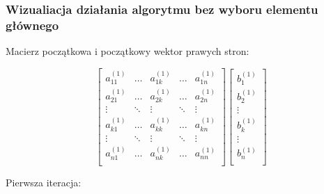 \documentclass{article}
\begin{document}
\subsubsection{Wizualiacja działania algorytmu bez wyboru elementu głównego}
Macierz początkowa i początkowy wektor prawych stron:
\begin{center}
    $$
    \begin{bmatrix}
        a^{(1)}_{11} & \dots & a^{(1)}_{1k} & \dots & a^{(1)}_{1n} \\
        a^{(1)}_{21} & \dots & a^{(1)}_{2k} & \dots & a^{(1)}_{2n} \\
        \vdots & \ddots &\vdots & \ddots & \vdots \\
        a^{(1)}_{k1} & \dots & a^{(1)}_{kk} & \dots & a^{(1)}_{kn} \\
        \vdots & \ddots & \vdots & \ddots & \vdots \\
        a^{(1)}_{n1} & \dots & a^{(1)}_{nk} & \dots & a^{(1)}_{nn} \\
    \end{bmatrix}
    \begin{bmatrix}
        b^{(1)}_{1} \\
        b^{(1)}_{2} \\
        \vdots \\
        b^{(1)}_{k} \\
        \vdots \\
        b^{(1)}_{n} \\
    \end{bmatrix}
    $$
\end{center}
Pierwsza iteracja:
\end{document}
